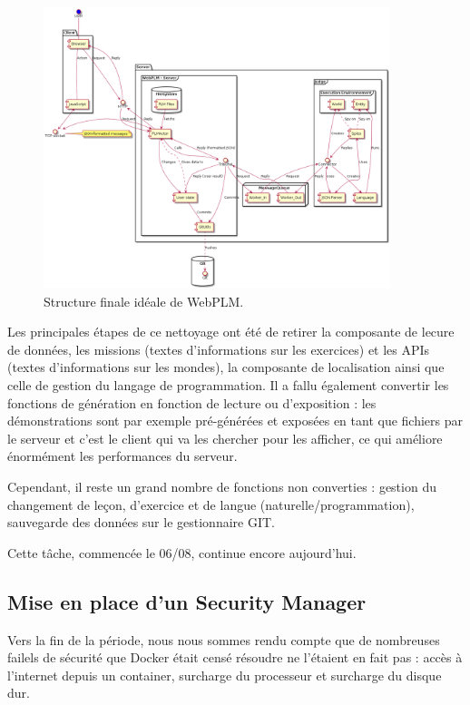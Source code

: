 \documentclass[stage]{tnreport}
\begin{document}
\begin{figure}[h]
	\centering
		\includegraphics[width=0.9\textwidth]{figures/WebPLM-uml-cp4}
	\caption{Structure finale idéale de WebPLM.}
	\label{fig:wplmUP4}
\end{figure}

Les principales étapes de ce nettoyage ont été de retirer la composante de lecure de données, les missions (textes d'informations sur les exercices) et les APIs (textes d'informations sur les mondes), la composante de localisation ainsi que celle de gestion du langage de programmation. Il a fallu également convertir les fonctions de génération en fonction de lecture ou d'exposition : les démonstrations sont par exemple pré-générées et exposées en tant que fichiers par le serveur et c'est le client qui va les chercher pour les afficher, ce qui améliore énormément les performances du serveur.

Cependant, il reste un grand nombre de fonctions non converties : gestion du changement de leçon, d'exercice et de langue (naturelle/programmation), sauvegarde des données sur le gestionnaire GIT.

Cette tâche, commencée le 06/08, continue encore aujourd'hui.

\subsection{Mise en place d'un Security Manager}

Vers la fin de la période, nous nous sommes rendu compte que de nombreuses failels de sécurité que Docker était censé résoudre ne l'étaient en fait pas : accès à l'internet depuis un container, surcharge du processeur et surcharge du disque dur.
\end{document}
